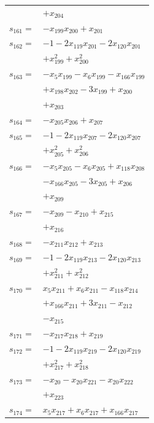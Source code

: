 \begin{longtable}{@{}r@{\;}l@{}}
 & \(\displaystyle +x_{204}\) \\[3pt]
\(s_{161}=\) & \(\displaystyle -x_{199}x_{200} +x_{201}\) \\[3pt]
\(s_{162}=\) & \(\displaystyle -1 -2x_{119}x_{201} -2x_{120}x_{201}\) \\
 & \(\displaystyle +x_{199}^{2} +x_{200}^{2}\) \\[3pt]
\(s_{163}=\) & \(\displaystyle -x_{5}x_{199} -x_{6}x_{199} -x_{166}x_{199}\) \\
 & \(\displaystyle +x_{198}x_{202} -3x_{199} +x_{200}\) \\
 & \(\displaystyle +x_{203}\) \\[3pt]
\(s_{164}=\) & \(\displaystyle -x_{205}x_{206} +x_{207}\) \\[3pt]
\(s_{165}=\) & \(\displaystyle -1 -2x_{119}x_{207} -2x_{120}x_{207}\) \\
 & \(\displaystyle +x_{205}^{2} +x_{206}^{2}\) \\[3pt]
\(s_{166}=\) & \(\displaystyle -x_{5}x_{205} -x_{6}x_{205} +x_{118}x_{208}\) \\
 & \(\displaystyle -x_{166}x_{205} -3x_{205} +x_{206}\) \\
 & \(\displaystyle +x_{209}\) \\[3pt]
\(s_{167}=\) & \(\displaystyle -x_{209} -x_{210} +x_{215}\) \\
 & \(\displaystyle +x_{216}\) \\[3pt]
\(s_{168}=\) & \(\displaystyle -x_{211}x_{212} +x_{213}\) \\[3pt]
\(s_{169}=\) & \(\displaystyle -1 -2x_{119}x_{213} -2x_{120}x_{213}\) \\
 & \(\displaystyle +x_{211}^{2} +x_{212}^{2}\) \\[3pt]
\(s_{170}=\) & \(\displaystyle x_{5}x_{211} +x_{6}x_{211} -x_{118}x_{214}\) \\
 & \(\displaystyle +x_{166}x_{211} +3x_{211} -x_{212}\) \\
 & \(\displaystyle -x_{215}\) \\[3pt]
\(s_{171}=\) & \(\displaystyle -x_{217}x_{218} +x_{219}\) \\[3pt]
\(s_{172}=\) & \(\displaystyle -1 -2x_{119}x_{219} -2x_{120}x_{219}\) \\
 & \(\displaystyle +x_{217}^{2} +x_{218}^{2}\) \\[3pt]
\(s_{173}=\) & \(\displaystyle -x_{20} -x_{20}x_{221} -x_{20}x_{222}\) \\
 & \(\displaystyle +x_{223}\) \\[3pt]
\(s_{174}=\) & \(\displaystyle x_{5}x_{217} +x_{6}x_{217} +x_{166}x_{217}\) \\

\end{longtable}
